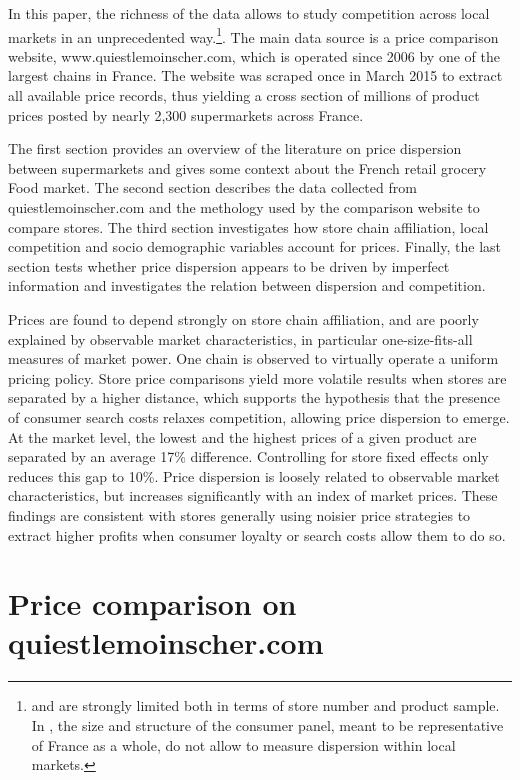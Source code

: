 \documentclass[english]{article}
\begin{document}
In this paper, the richness of the data allows to study competition across local markets in an unprecedented way.\footnote{\cite{LAC02} and \cite{ZHA06} are strongly limited both in terms of store number and product sample. In \cite{PER15}, the size and structure of the consumer panel, meant to be representative of France as a whole, do not allow to measure dispersion within local markets.}. The main data source is a price comparison website, www.quiestlemoinscher.com, which is operated since 2006 by one of the largest chains in France. The website was scraped once in March 2015 to extract all available price records, thus yielding a cross section of millions of product prices posted by nearly 2,300 supermarkets across France.

The first section provides an overview of the literature on price dispersion between supermarkets and gives some context about the French retail grocery Food market. The second section describes the data collected from quiestlemoinscher.com and the methology used by the comparison website to compare stores. The third section investigates how store chain affiliation, local competition and socio demographic variables account for prices. Finally, the last section tests whether price dispersion appears to be driven by imperfect information and investigates the relation between dispersion and competition.

Prices are found to depend strongly on store chain affiliation, and are poorly explained by observable market characteristics, in particular one-size-fits-all measures of market power. One chain is observed to virtually operate a uniform pricing policy. Store price comparisons yield more volatile results when stores are separated by a higher distance, which supports the hypothesis that the presence of consumer search costs relaxes competition, allowing price dispersion to emerge. At the market level, the lowest and the highest prices of a given product are separated by an average 17\% difference. Controlling for store fixed effects only reduces this gap to 10\%. Price dispersion is loosely related to observable market characteristics, but increases significantly with an index of market prices. These findings are consistent with stores generally using noisier price strategies to extract higher profits when consumer loyalty or search costs allow them to do so.

\section{Price comparison on quiestlemoinscher.com}
\end{document}
